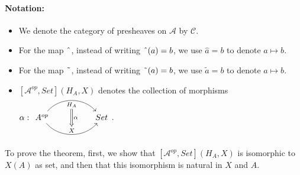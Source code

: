 \documentclass[18pt,a4paper]{article}
\theoremstyle{definition}
\begin{document}
\paragraph{Notation:} \begin{itemize}
	\item We denote the category of presheaves on $\mathcal{A}$ by $\mathcal{C}$.
	\item For the map $\string ^$, instead of writing $\string ^ (a)=b$,
		we use $\hat{a} = b$ to denote $a \mapsto b$.

	\item For the map $\string ~$, instead of writing $\string ~ (a)=b$,
		we use $\tilde{a} = b$ to denote $a \mapsto b$.
	\item $[ \mathcal{A}^{op},Set](	H_A,X) $ denotes the collection of morphisms $\alpha: \begin{tikzcd}[row sep=large, column sep=huge]
				A^{op} \arrow[r,bend left=50, "H_A"{name=U, below}]
					\arrow[r, bend right = 50, "X"{name=D, above}]
					& Set
					\arrow[Rightarrow, from=U , to=D, "\alpha"]
		\end{tikzcd}$.
\end{itemize}
To prove the theorem,
first, we show that $[ \mathcal{A} ^{op}, Set](H_A,X)$ is isomorphic to $X(A) $ as set,
and then that this isomorphism is natural in $X$ and $A$.
\end{document}
